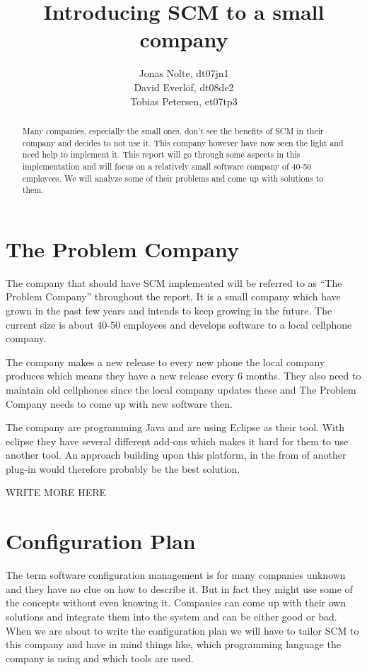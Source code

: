 \documentclass[a4paper,10pt]{article}
\title{Introducing SCM to a small company}
\author{Jonas Nolte, dt07jn1\\
David Everlöf, dt08de2\\
Tobias Petersen, et07tp3}
\begin{document}
\maketitle

\begin{abstract}

Many companies, especially the small ones, don't see the benefits of SCM in their company and decides to not use it.
This company however have now seen the light and need help to implement it.
This report will go through some aspects in this implementation and will focus on a relatively small software company of 40-50 employees.
We will analyze some of their problems and come up with solutions to them.


\end{abstract}

\section{The Problem Company}

The company that should have SCM implemented will be referred to as “The Problem Company” throughout the report.
It is a small company which have grown in the past few years and intends to keep growing in the future. The current size is about 40-50 employees and develops software to a local cellphone company.

The company makes a new release to every new phone the local company produces which means they have a new release every 6 months.
They also need to maintain old cellphones since the local company updates these and The Problem Company needs to come up with new software then.

The company are programming Java and are using Eclipse as their tool.
With eclipse they have several different add-ons which makes it hard for them to use another tool. An approach building upon this platform, in the from of another plug-in would therefore probably be the best solution.

WRITE MORE HERE

\section{Configuration Plan}

The term software configuration management is for many companies unknown and they have no clue on how to describe it.
But in fact they might use some of the concepts without even knowing it.
Companies can come up with their own solutions and integrate them into the system and can be either good or bad. When we are about to write the configuration plan we will have to tailor SCM to this company and have in mind things like, which programming language the company is using and which tools are used.
\end{document}
